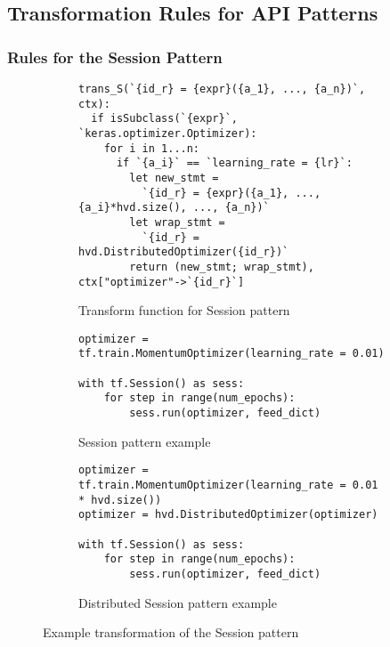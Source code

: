 \subsection{Transformation Rules for API Patterns}


\subsubsection{Rules for the Session Pattern}

\begin{figure}[h!]\centering

  \begin{subfigure}{1\textwidth}
  \scriptsize
  \begin{lstlisting}[style=mpython]
trans_S(`{id_r} = {expr}({a_1}, ..., {a_n})`, ctx): 
  if isSubclass(`{expr}`, `keras.optimizer.Optimizer):
    for i in 1...n:
      if `{a_i}` == `learning_rate = {lr}`:
	    let new_stmt = 
          `{id_r} = {expr}({a_1}, ..., {a_i}*hvd.size(), ..., {a_n})`
        let wrap_stmt = 
          `{id_r} = hvd.DistributedOptimizer({id_r})`
        return (new_stmt; wrap_stmt), ctx["optimizer"->`{id_r}`] 
  \end{lstlisting}
  \caption{Transform function for Session pattern}
  \label{fig:trans:sessiontrans:fn}
  \end{subfigure}

  \begin{subfigure}[t]{1\textwidth}
    \begin{lstlisting}[style=mpython]
optimizer = tf.train.MomentumOptimizer(learning_rate = 0.01)

with tf.Session() as sess:
    for step in range(num_epochs): 
        sess.run(optimizer, feed_dict)\end{lstlisting}
    \caption{Session pattern example}
    \label{fig:trans:sessiontrans:a}
  \end{subfigure}
  \hspace{5mm}
  \begin{subfigure}[t]{1\textwidth}
    \begin{lstlisting}[style=mpython]
optimizer = tf.train.MomentumOptimizer(learning_rate = 0.01 * hvd.size())
optimizer = hvd.DistributedOptimizer(optimizer)

with tf.Session() as sess:
    for step in range(num_epochs): 
        sess.run(optimizer, feed_dict)\end{lstlisting}
    \caption{Distributed Session pattern example}
    \label{fig:trans:sessiontrans:b}
  \end{subfigure}
  \caption{Example transformation of the Session pattern}
  \label{fig:trans:sessiontrans}
\end{figure}

